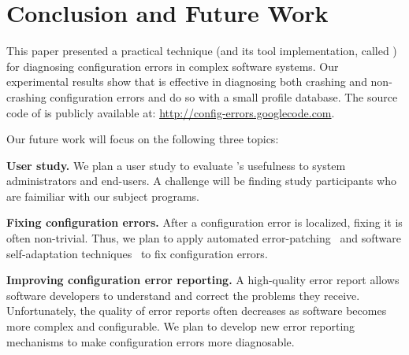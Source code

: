 \section{Conclusion and Future Work}

This paper presented a practical technique (and
its tool implementation, called \ourtool) for diagnosing
configuration errors in complex software systems.
Our experimental results show that \ourtool is effective in
diagnosing both crashing and non-crashing configuration errors
and do so with a small profile database.
The source code of \ourtool is publicly available at:
\url{http://config-errors.googlecode.com}.

\vspace{1mm}

Our future
work will focus on the following three topics:

\textbf{User study.} We plan a user study to evaluate
\ourtool's usefulness to system administrators and
end-users. A challenge will be finding study participants
who are faimiliar with our subject programs.

\textbf{Fixing configuration errors.} After a configuration error
is localized, fixing it is
often non-trivial. Thus, we
plan to apply automated error-patching~\cite{rangefix} and
software self-adaptation techniques~\cite{Wang:2009:STR} to
fix configuration errors.


\textbf{Improving configuration error reporting.} A high-quality
error report allows software developers to understand and correct the problems
they receive. 
Unfortunately, the quality of error reports often
decreases as software becomes more complex and configurable.
We plan to develop new error reporting mechanisms
to make configuration errors
more diagnosable.

